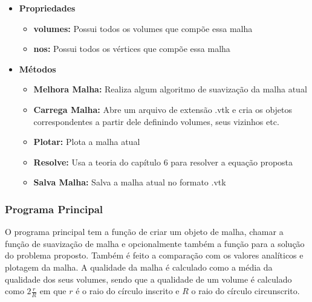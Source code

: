 \begin{itemize}
    \item \textbf{Propriedades}
    \begin{itemize}
        \item \textbf{volumes:} Possui todos os volumes que compõe essa malha
        \item \textbf{nos:} Possui todos os vértices que compõe essa malha
    \end{itemize}
    \item \textbf{Métodos}
    \begin{itemize}
        \item \textbf{Melhora Malha:} Realiza algum algoritmo de suavização da malha atual
        \item \textbf{Carrega Malha:} Abre um arquivo de extensão .vtk e cria os objetos correspondentes a partir dele definindo volumes, seus vizinhos etc.
        \item \textbf{Plotar:} Plota a malha atual
        \item \textbf{Resolve:} Usa a teoria do capítulo 6 para resolver a equação proposta
        \item \textbf{Salva Malha:} Salva a malha atual no formato .vtk
    \end{itemize}
\end{itemize}

\subsubsection{Programa Principal}
O programa principal tem a função de criar um objeto de malha, chamar a função de suavização de malha e opcionalmente também a função para a solução do problema proposto. Também é feito a comparação com os valores analíticos e plotagem da malha. A qualidade da malha é calculado como a média da qualidade dos seus volumes, sendo que a qualidade de um volume é calculado como $2\frac{r}{R}$ em que $r$ é o raio do círculo inscrito e $R$ o raio do círculo circunscrito.